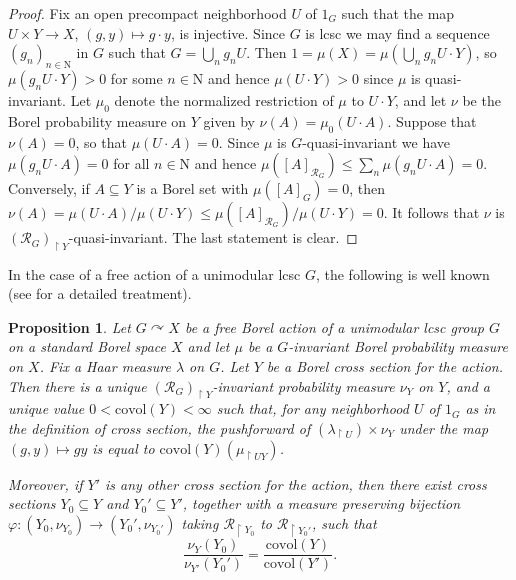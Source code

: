 \documentclass[11pt]{amsart}
\theoremstyle{definition}
\theoremstyle{plain}
\newtheorem{proposition}[definition]{Proposition}
\newcommand{\<}{\langle}
\renewcommand{\>}{\rangle}
\newcommand{\N}{\bm{\mathrm{N}}}
\newcommand{\pmp}{\text{p.m.p.}}
\newcommand\RR{\mathscr{R}}
\begin{document}
\begin{appendices}
\begin{proof}
Fix an open precompact neighborhood $U$ of $1_G$ such that the map $U\times Y \rightarrow X$, $(g,y)\mapsto g\cdot y$, is injective. Since $G$ is lcsc we may find a sequence $(g_n)_{n\in \N}$ in $G$ such that $G=\bigcup _n g_nU$. Then $1= \mu (X) = \mu (\bigcup _n g_n U\cdot Y )$, so $\mu (g_nU \cdot Y)>0$ for some $n\in \N$ and hence $\mu (U\cdot Y)>0$ since $\mu$ is quasi-invariant. Let $\mu _0$ denote the normalized restriction of $\mu$ to $U\cdot Y$, and let $\nu$ be the Borel probability measure on $Y$ given by $\nu (A) = \mu _0(U\cdot A)$. Suppose that $\nu (A) =0$, so that $\mu (U\cdot A) =0$. Since $\mu$ is $G$-quasi-invariant we have $\mu (g_nU\cdot A)= 0$ for all $n\in \N$ and hence $\mu ([A]_{\RR_G} )\leq \sum _n \mu (g_nU\cdot A ) =0$. Conversely, if $A\subseteq Y$ is a Borel set with $\mu ([A]_G ) =0$, then $\nu (A) = \mu (U \cdot A)/ \mu (U\cdot Y ) \leq \mu ([A]_{\RR_G})/\mu (U\cdot Y ) = 0$. It follows that $\nu$ is $(\RR_{G})_{\restriction Y}$-quasi-invariant. The last statement is clear.
\end{proof}

In the case of a free \pmp{} action of a unimodular lcsc $G$, the following is well known (see \cite{Kyed-Petersen-Vaes-L2} for a detailed treatment).

\begin{proposition}\label{prop:covol}
Let $G\curvearrowright X$ be a free Borel action of a unimodular lcsc group $G$ on a standard Borel space $X$ and let $\mu$ be a $G$-invariant Borel probability measure on $X$. Fix a Haar measure $\lambda$ on $G$. Let $Y$ be a Borel cross section for the action. Then there is a unique $(\RR_{G})_{\restriction Y}$-invariant probability measure $\nu _Y$ on $Y$, and a unique value $0<\mathrm{covol}(Y)<\infty$ such that, for any neighborhood $U$ of $1_G$ as in the definition of cross section, the pushforward of $(\lambda_{\restriction U} )\times \nu _Y$ under the map $(g,y)\mapsto gy$ is equal to $\mathrm{covol}(Y)(\mu_{\restriction UY} )$.

Moreover, if $Y'$ is any other cross section for the action, then there exist cross sections $Y_0\subseteq Y$ and $Y_0'\subseteq Y'$, together with a measure preserving bijection $\varphi : (Y_0, \nu _{Y_0})\rightarrow (Y_0', \nu _{Y_0'})$ taking $\RR_{\restriction Y_0}$ to $\RR_{\restriction Y_0'}$, such that
\[
\frac{\nu _Y (Y_0)}{\nu _{Y'}(Y_0')} = \frac{\mathrm{covol}(Y)}{\mathrm{covol}(Y')}.
\]
\end{proposition}


\end{appendices}
\end{document}

